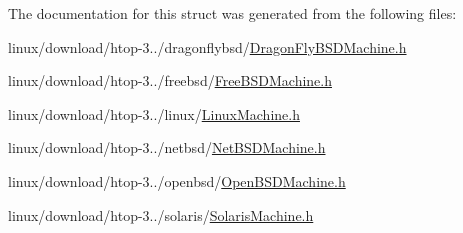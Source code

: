 The documentation for this struct was generated from the following files\+:\begin{DoxyCompactItemize}
\item 
linux/download/htop-\/3../dragonflybsd/\hyperlink{DragonFlyBSDMachine_8h}{Dragon\+Fly\+B\+S\+D\+Machine.\+h}\item 
linux/download/htop-\/3../freebsd/\hyperlink{FreeBSDMachine_8h}{Free\+B\+S\+D\+Machine.\+h}\item 
linux/download/htop-\/3../linux/\hyperlink{LinuxMachine_8h}{Linux\+Machine.\+h}\item 
linux/download/htop-\/3../netbsd/\hyperlink{NetBSDMachine_8h}{Net\+B\+S\+D\+Machine.\+h}\item 
linux/download/htop-\/3../openbsd/\hyperlink{OpenBSDMachine_8h}{Open\+B\+S\+D\+Machine.\+h}\item 
linux/download/htop-\/3../solaris/\hyperlink{SolarisMachine_8h}{Solaris\+Machine.\+h}\end{DoxyCompactItemize}
